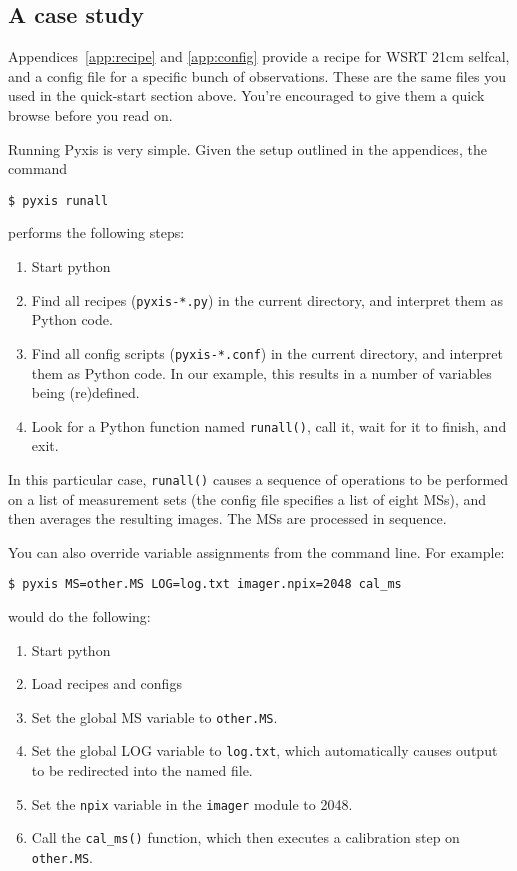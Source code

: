 \documentclass[a4paper,10pt]{article}
\begin{document}
\subsection{A case study}

Appendices~\ref{app:recipe} and \ref{app:config} provide a recipe for WSRT 21cm selfcal, and 
a config file for a specific bunch of observations. These are the same files you used in the quick-start section above.
You're encouraged to give them a quick browse before you read on.

Running Pyxis is very simple. Given the setup outlined in the  appendices, the command

\begin{verbatim}
$ pyxis runall
\end{verbatim}

performs the following steps:

\begin{enumerate}
  \item Start python
  \item Find all recipes ({\tt pyxis-*.py}) in the current directory, and interpret them as Python code.
  \item Find all config scripts ({\tt pyxis-*.conf}) in the current directory, and interpret them as Python code. In 
our example, this results in a number of variables being (re)defined.
  \item Look for a Python function named {\tt runall()}, call it, wait for it to finish, and exit.
\end{enumerate}

In this particular case, {\tt runall()} causes a sequence of operations to be performed on a list of measurement
sets (the config file specifies a list of eight MSs), and then averages the resulting images. 
The MSs are processed in sequence.

You can also override variable assignments from the command line. For example:

\begin{verbatim}
$ pyxis MS=other.MS LOG=log.txt imager.npix=2048 cal_ms
\end{verbatim}

would do the following:

\begin{enumerate}
  \item Start python
  \item Load recipes and configs
  \item Set the global MS variable to {\tt other.MS}. 
  \item Set the global LOG variable to {\tt log.txt}, which automatically causes output to be redirected into the named file.
  \item Set the {\tt npix} variable in the {\tt imager} module to 2048.
  \item Call the {\tt cal\_ms()} function, which then executes a calibration step on {\tt other.MS}.
\end{enumerate}
\end{document}
